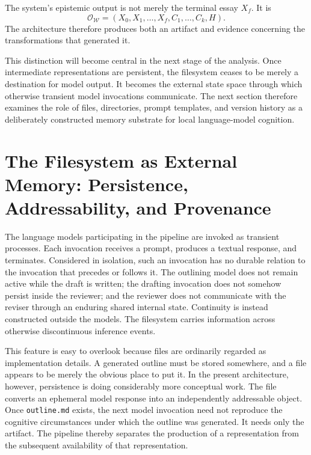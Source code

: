 \documentclass[11pt]{article}
\begin{document}
The system's epistemic output is not merely the terminal essay \(X_f\). It is
\[
    \mathcal{O}_{\mathcal{W}}
    =
    \left(
        X_0,
        X_1,
        \ldots,
        X_f,
        C_1,\ldots,C_k,
        H
    \right).
\]
The architecture therefore produces both an artifact and evidence concerning the transformations that generated it.

This distinction will become central in the next stage of the analysis. Once intermediate representations are persistent, the filesystem ceases to be merely a destination for model output. It becomes the external state space through which otherwise transient model invocations communicate. The next section therefore examines the role of files, directories, prompt templates, and version history as a deliberately constructed memory substrate for local language-model cognition.

\section{The Filesystem as External Memory: Persistence, Addressability, and Provenance}

The language models participating in the pipeline are invoked as transient processes. Each invocation receives a prompt, produces a textual response, and terminates. Considered in isolation, such an invocation has no durable relation to the invocation that precedes or follows it. The outlining model does not remain active while the draft is written; the drafting invocation does not somehow persist inside the reviewer; and the reviewer does not communicate with the reviser through an enduring shared internal state. Continuity is instead constructed outside the models. The filesystem carries information across otherwise discontinuous inference events.

This feature is easy to overlook because files are ordinarily regarded as implementation details. A generated outline must be stored somewhere, and a file appears to be merely the obvious place to put it. In the present architecture, however, persistence is doing considerably more conceptual work. The file converts an ephemeral model response into an independently addressable object. Once \texttt{outline.md} exists, the next model invocation need not reproduce the cognitive circumstances under which the outline was generated. It needs only the artifact. The pipeline thereby separates the production of a representation from the subsequent availability of that representation.
\end{document}

